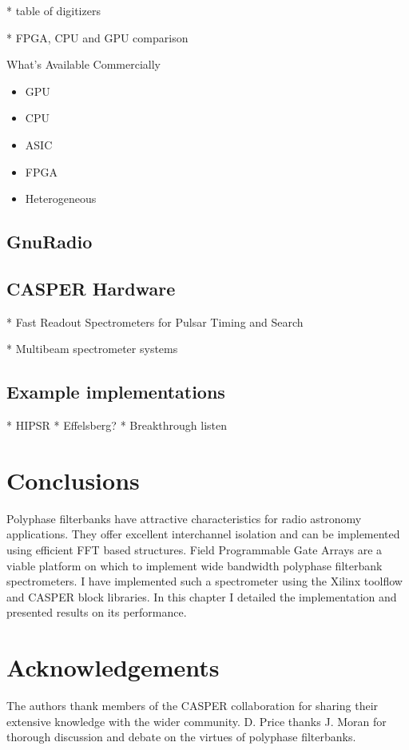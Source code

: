 \documentclass{ws-rv961x669}
\begin{document}
* table of digitizers

* FPGA, CPU and GPU comparison

What's Available Commercially

\begin{itemize}
	\item GPU
    \item CPU
    \item ASIC
    \item FPGA
    \item Heterogeneous	
\end{itemize}


\subsection{GnuRadio}

\subsection{CASPER Hardware}

* Fast Readout Spectrometers for Pulsar Timing and Search

* Multibeam spectrometer systems


\subsection{Example implementations}

* HIPSR
* Effelsberg?
* Breakthrough listen

\section{Conclusions}

Polyphase filterbanks have attractive characteristics for radio astronomy applications. They offer excellent interchannel isolation and can be implemented using efficient FFT based structures. Field Programmable Gate Arrays are a viable platform on which to implement wide bandwidth polyphase filterbank spectrometers. I have implemented such a spectrometer using the Xilinx toolflow and CASPER block libraries. In this chapter I detailed the implementation and presented results on its performance.

\section{Acknowledgements}

The authors thank members of the CASPER collaboration for sharing their extensive knowledge with the wider community. D. Price thanks J. Moran for thorough discussion and debate on the virtues of polyphase filterbanks. 



\end{document}
